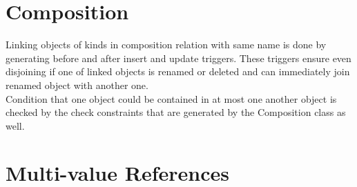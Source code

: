\documentclass[deska]{subfiles}
\begin{document}
\section{Composition}
Linking objects of kinds in composition relation with same name is done by generating before and after insert and update triggers. These triggers ensure even disjoining if one of linked objects is renamed or deleted and can immediately join renamed object with another one.\\
Condition that one object could be contained in at most one another object is checked by the check constraints that are generated by the Composition class as well.

\section{Multi-value References}
\label{sec:multi-val}
\end{document}
